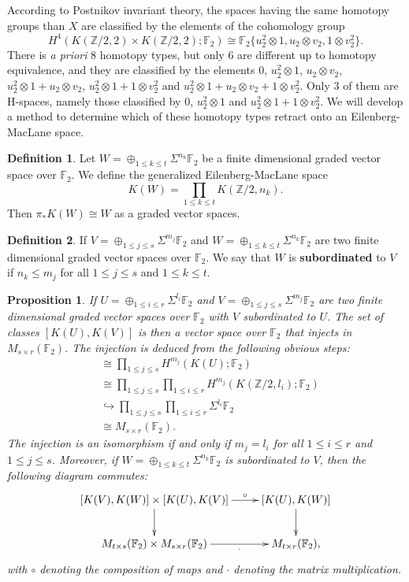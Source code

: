 \documentclass[11pt,a4paper]{amsart}
\theoremstyle{plain}
\newtheorem{prop}[thm]{Proposition}
\theoremstyle{definition}
\newtheorem{defn}{Definition}[section]
\theoremstyle{remark}
\newcommand{\Z}{\mathbb{Z}}
\newcommand{\F}{\mathbb{F}}
\renewcommand{\leq}{\leqslant}
\begin{document}
According to Postnikov invariant theory, the spaces having the same homotopy groups than $X$ are classified by the elements of the cohomology group $$H^4(K(\Z/2,2)\times K(\Z/2,2);\F_2)\cong\F_2\{u_2^2\otimes1,u_2\otimes v_2,1\otimes v_2^2\}.$$ There is {\it a priori} $8$ homotopy types, but only $6$ are different up to homotopy equivalence, and they are classified by the elements $0$, $u_2^2\otimes1$, $u_2\otimes v_2$, $u_2^2\otimes1+u_2\otimes v_2$, $u_2^2\otimes1+1\otimes v_2^2$ and $u_2^2\otimes1+u_2\otimes v_2+1\otimes v_2^2$. Only $3$ of them are H-spaces, namely those classified by $0$, $u_2^2\otimes1$ and $u_2^2\otimes1+1\otimes v_2^2$. We will develop a method to determine which of these homotopy types retract onto an Eilenberg-MacLane space.

\begin{defn}
Let $W=\oplus_{1\leq k\leq t}\Sigma^{n_k}\F_2$ be a finite dimensional graded vector space over $\F_2$. We define the generalized Eilenberg-MacLane space
$$
K(W)=\prod_{1\leq k\leq t}K(\Z/2,n_k).
$$ Then $\pi_*K(W)\cong W$ as a graded vector spaces.
\end{defn}

\begin{defn}
If $V=\oplus_{1\leq j\leq s}\Sigma^{m_j}\F_2$ and $W=\oplus_{1\leq k\leq t}\Sigma^{n_k}\F_2$ are two finite dimensional graded vector spaces over $\F_2$. We say that $W$ is {\bf subordinated} to $V$ if $n_k\leq m_j$ for all $1\leq j\leq s$ and $1\leq k\leq t$.
\end{defn}

\begin{prop}
If $U=\oplus_{1\leq i\leq r}\Sigma^{l_i}\F_2$ and $V=\oplus_{1\leq j\leq s}\Sigma^{m_j}\F_2$ are two finite dimensional graded vector spaces over $\F_2$ with $V$ subordinated to $U$. The set of classes $[K(U),K(V)]$ is then a vector space over $\F_2$ that injects in $M_{s\times r}(\F_2)$. The injection is deduced from the following obvious steps:
\begin{align*}
[K(U),K(V)] &\cong\prod_{1\leq j\leq s}H^{m_j}(K(U);\F_2)\\
&\cong\prod_{1\leq j\leq s}\prod_{1\leq i\leq r}H^{m_j}(K(\Z/2,l_i);\F_2)\\
&\hookrightarrow \prod_{1\leq j\leq s}\prod_{1\leq i\leq r}\Sigma^{l_i}\F_2\\
&\cong M_{s\times r}(\F_2).
\end{align*}
The injection is an isomorphism if and only if $m_j=l_i$ for all $1\leq i\leq r$ and $1\leq j\leq s$. Moreover, if $W=\oplus_{1\leq k\leq t}\Sigma^{n_k}\F_2$ is subordinated to $V$, then the following diagram commutes:
$$\xymatrix{
[K(V),K(W)]\times[K(U),K(V)]\ar[d]\ar[r]^-\circ &[K(U),K(W)]\ar[d]\\
M_{t\times s}(\F_2)\times M_{s\times r}(\F_2)\ar[r]_-\cdot &M_{t\times r}(\F_2),
}$$ with $\circ$ denoting the composition of maps and $\cdot$ denoting the matrix multiplication.
\end{prop}
\end{document}
